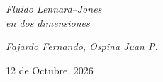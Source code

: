 \begin{center}
    \vspace{12mm}

    \LARGE{\textit{Fluido  Lennard–Jones \\ en dos dimensiones}}
    \vspace{3mm}
    
    \textit{\large{Fajardo Fernando, Ospina Juan P.}}
    \vspace{1mm}
            
    \normalsize{12 de Octubre, 2026}
    \vspace{10mm}
\end{center}

\vspace{35pt}